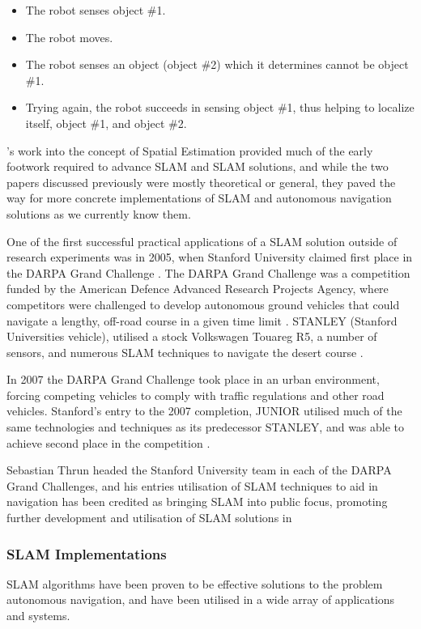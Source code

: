 \begin{itemize}
    \item The robot senses object \#1.
    \item The robot moves. 
    \item The robot senses an object (object \#2) which it determines cannot be
    object \#1.
    \item Trying again, the robot succeeds in sensing object \#1, thus helping
    to localize itself, object \#1, and object \#2.
\end{itemize}

\citeauthor*{Smith1988}'s work into the concept of Spatial Estimation
provided much of the early footwork required to advance SLAM and SLAM
solutions, and while the two papers discussed previously were mostly
theoretical or general, they paved the way for more concrete implementations
of SLAM and autonomous navigation solutions as we currently know them.

One of the first successful practical applications of a SLAM solution outside of
research experiments was in 2005, when Stanford University claimed first
place in the DARPA Grand Challenge \cite{dahlkamp2006self}.
The DARPA Grand Challenge was a competition funded by the American Defence
Advanced Research Projects Agency, where competitors were challenged to
develop autonomous ground vehicles that could navigate a lengthy, off-road
course in a given time limit \cite{buehler20072005}. 
STANLEY (Stanford Universities vehicle), utilised a stock Volkswagen
Touareg R5, a number of sensors, and numerous SLAM techniques to navigate the
desert course \cite{thrun2006stanley}.

In 2007 the DARPA Grand Challenge took place in an urban environment, forcing
competing vehicles to comply with traffic regulations and other road vehicles.
Stanford's entry to the 2007 completion, JUNIOR utilised much of the same
technologies and techniques as its predecessor STANLEY, and was able to achieve
second place in the competition \cite{montemerlo2008junior}.

Sebastian Thrun \cite{sebastian} headed the Stanford University team in each
of the DARPA Grand Challenges, and his entries utilisation of SLAM techniques
to aid in navigation \cite{Thrun2006} has been credited as bringing SLAM into
public focus, promoting further development and utilisation of SLAM solutions
in

\subsubsection{SLAM Implementations}
SLAM algorithms have been proven to be effective solutions to the problem
autonomous navigation, and have been utilised in a wide array of applications
and systems.


